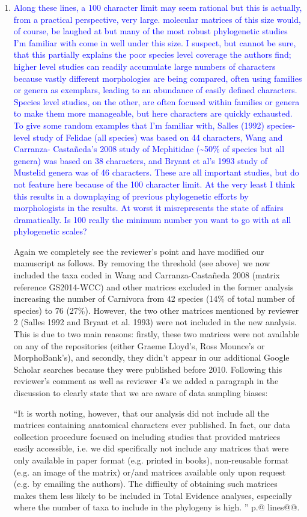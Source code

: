 \documentclass[12pt,letterpaper]{article}
\begin{document}
\begin{enumerate}
\item{\textcolor{blue}{Along these lines, a 100 character limit may seem rational but this is actually, from a practical perspective, very large. molecular matrices of this size would, of course, be laughed at but many of the most robust phylogenetic studies I'm familiar with come in well under this size. I suspect, but cannot be sure, that this partially explains the poor species level coverage the authors find; higher level studies can readily accumulate large numbers of characters because vastly different morphologies are being compared, often using families or genera as exemplars, leading to an abundance of easily defined characters. Species level studies, on the other, are often focused within families or genera to make them more manageable, but here characters are quickly exhausted. To give some random examples that I'm familiar with, Salles (1992) species-level study of Felidae (all species) was based on 44 characters, Wang and Carranza- Casta\~{n}eda's 2008 study of Mephitidae (\textasciitilde50\% of species but all genera) was based on 38 characters, and Bryant et al's 1993 study of Mustelid genera was of 46 characters. These are all important studies, but do not feature here because of the 100 character limit. At the very least I think this results in a downplaying of previous phylogenetic efforts by morphologists in the results. At worst it misrepresents the state of affairs dramatically. Is 100 really the minimum number you want to go with at all phylogenetic scales?}}

Again we completely see the reviewer's point and have modified our manuscript as follows.
By removing the threshold (see above) we now included the taxa coded in Wang and Carranza-Casta\~{n}eda 2008 (matrix reference GS2014-WCC) and other matrices excluded in the former analysis increasing the number of Carnivora from 42 species (14\% of total number of species) to 76 (27\%).
However, the two other matrices mentioned by reviewer 2 (Salles 1992 and Bryant et al. 1993) were not included in the new analysis.
This is due to two main reasons: firstly, these two matrices were not available on any of the repositories (either Graeme Lloyd's, Ross Mounce's or MorphoBank's), and secondly, they didn't appear in our additional Google Scholar searches because they were published before 2010.
Following this reviewer's comment as well as reviewer 4's we added a paragraph in the discussion to clearly state that we are aware of data sampling biases:

``It is worth noting, however, that our analysis did not include all the matrices containing anatomical characters ever published.
In fact, our data collection procedure focused on including studies that provided matrices easily accessible, i.e. we did specifically not include any matrices that were only available in paper format (e.g. printed in books), non-reusable format (e.g. an image of the matrix)  or/and matrices available only upon request (e.g. by emailing the authors).
The difficulty of obtaining such matrices makes them less likely to be included in Total Evidence analyses, especially where the number of taxa to include in the phylogeny is high.
'' p.@ lines@@.



\end{enumerate}
\end{document}
